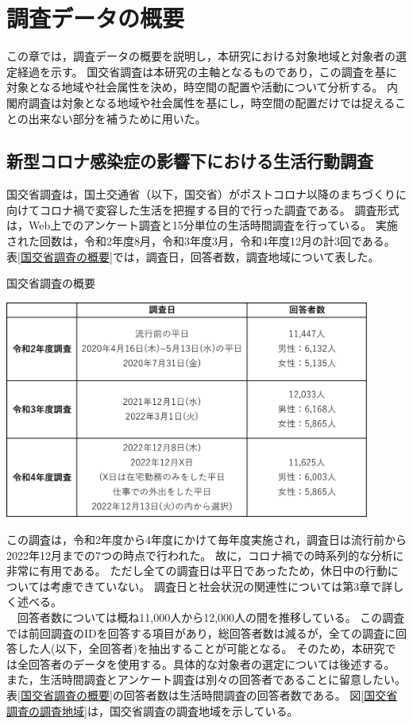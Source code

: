 \documentclass[paper={210mm,297mm},line_length=35zw,number_of_lines=31,head_space=30mm,gutter=40mm,baselineskip=2.0zw,headfoot_verticalposition=1.5zw]{jlreq}
\begin{document}
\section{調査データの概要}
この章では，調査データの概要を説明し，本研究における対象地域と対象者の選定経過を示す。
国交省調査は本研究の主軸となるものであり，この調査を基に対象となる地域や社会属性を決め，時空間の配置や活動について分析する。
内閣府調査は対象となる地域や社会属性を基にし，時空間の配置だけでは捉えることの出来ない部分を補うために用いた。\\

\subsection{新型コロナ感染症の影響下における生活行動調査}
国交省調査は，国土交通省（以下，国交省）がポストコロナ以降のまちづくりに向けてコロナ禍で変容した生活を把握する目的で行った調査である。
調査形式は，Web上でのアンケート調査と15分単位の生活時間調査を行っている。
実施された回数は，令和2年度8月，令和3年度3月，令和4年度12月の計3回である。
表\ref{国交省調査の概要}では，調査日，回答者数，調査地域について表した。

\begin{table}[H]
  \caption{国交省調査の概要}
  \centering
  \includegraphics[width=120mm]{../Figure/c02s01_table_国交省調査の概要.png}
  \label{国交省調査の概要}
\end{table}

この調査は，令和2年度から4年度にかけて毎年度実施され，調査日は流行前から2022年12月までの7つの時点で行われた。
故に，コロナ禍での時系列的な分析に非常に有用である。
ただし全ての調査日は平日であったため，休日中の行動については考慮できていない。
調査日と社会状況の関連性については第3章で詳しく述べる。\\
　回答者数については概ね11,000人から12,000人の間を推移している。
この調査では前回調査のIDを回答する項目があり，総回答者数は減るが，全ての調査に回答した人(以下，全回答者)を抽出することが可能となる。
そのため，本研究では全回答者のデータを使用する。具体的な対象者の選定については後述する。
また，生活時間調査とアンケート調査は別々の回答者であることに留意したい。
表\ref{国交省調査の概要}の回答者数は生活時間調査の回答者数である。
図\ref{国交省調査の調査地域}は，国交省調査の調査地域を示している。\\
\end{document}
